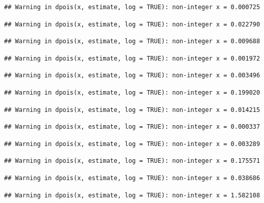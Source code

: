 \documentclass[]{article}
\begin{document}
\begin{verbatim}
## Warning in dpois(x, estimate, log = TRUE): non-integer x = 0.000725
\end{verbatim}

\begin{verbatim}
## Warning in dpois(x, estimate, log = TRUE): non-integer x = 0.022790
\end{verbatim}

\begin{verbatim}
## Warning in dpois(x, estimate, log = TRUE): non-integer x = 0.009688
\end{verbatim}

\begin{verbatim}
## Warning in dpois(x, estimate, log = TRUE): non-integer x = 0.001972
\end{verbatim}

\begin{verbatim}
## Warning in dpois(x, estimate, log = TRUE): non-integer x = 0.003496
\end{verbatim}

\begin{verbatim}
## Warning in dpois(x, estimate, log = TRUE): non-integer x = 0.199020
\end{verbatim}

\begin{verbatim}
## Warning in dpois(x, estimate, log = TRUE): non-integer x = 0.014215
\end{verbatim}

\begin{verbatim}
## Warning in dpois(x, estimate, log = TRUE): non-integer x = 0.000337
\end{verbatim}

\begin{verbatim}
## Warning in dpois(x, estimate, log = TRUE): non-integer x = 0.003289
\end{verbatim}

\begin{verbatim}
## Warning in dpois(x, estimate, log = TRUE): non-integer x = 0.175571
\end{verbatim}

\begin{verbatim}
## Warning in dpois(x, estimate, log = TRUE): non-integer x = 0.038686
\end{verbatim}

\begin{verbatim}
## Warning in dpois(x, estimate, log = TRUE): non-integer x = 1.582108
\end{verbatim}
\end{document}
